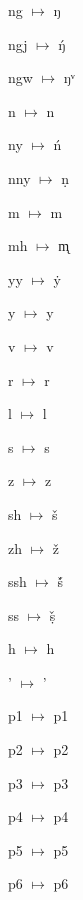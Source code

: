 {\noindent ng $\mapsto$ ŋ\par
\noindent ngj $\mapsto$ ŋ́\par
\noindent ngw $\mapsto$ ŋᵛ\par
\noindent n $\mapsto$ n\par
\noindent ny $\mapsto$ ń\par
\noindent nny $\mapsto$ ṇ\par
\noindent m $\mapsto$ m\par
\noindent mh $\mapsto$ m̨\par
\noindent yy $\mapsto$ ẏ\par
\noindent y $\mapsto$ y\par
\noindent v $\mapsto$ v\par
\noindent r $\mapsto$ r\par
\noindent l $\mapsto$ l\par
\noindent s $\mapsto$ s\par
\noindent z $\mapsto$ z\par
\noindent sh $\mapsto$ š\par
\noindent zh $\mapsto$ ž\par
\noindent ssh $\mapsto$ š́\par
\noindent ss $\mapsto$ ṣ̌\par
\noindent h $\mapsto$ h\par
\noindent ' $\mapsto$ '\par
\noindent p1 $\mapsto$ p1\par
\noindent p2 $\mapsto$ p2\par
\noindent p3 $\mapsto$ p3\par
\noindent p4 $\mapsto$ p4\par
\noindent p5 $\mapsto$ p5\par
\noindent p6 $\mapsto$ p6\par
}





